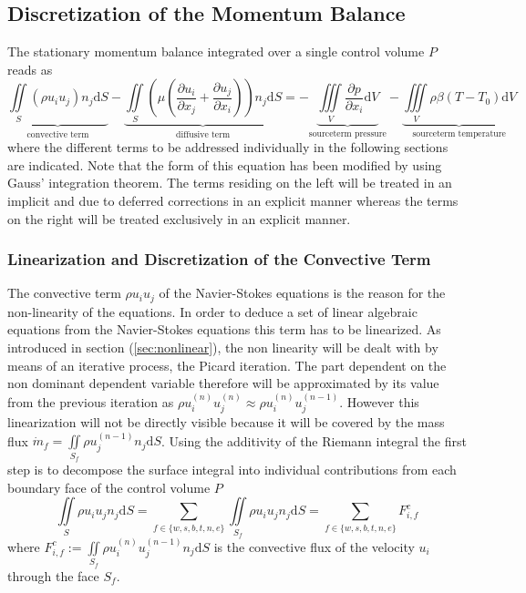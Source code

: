   \subsection{Discretization of the Momentum Balance}
  \label{sec:segdiscretization}

      The stationary momentum balance integrated over a single control volume \(P\) reads as
      \begin{equation}
        \label{eq:semidiscrete}
        \underbrace{\iint\limits_S (\rho u_i u_j)n_j \mathrm{d}S}_{\text{convective term}}
        - \underbrace{\iint\limits_S \left(\mu \left( \frac{\partial u_i}{\partial x_j} + \frac{\partial u_j}{\partial x_i}\right)\right)n_j \mathrm{d}S}_{\text{diffusive term}}
        = - \underbrace{\iiint\limits_V \frac{\partial p}{\partial x_i} \mathrm{d}V}_{\text{sourceterm pressure}}
        - \underbrace{\iiint\limits_V \rho \beta \left(T - T_0\right) \mathrm{d}V}_{\text{sourceterm temperature}}
      \end{equation}
      where the different terms to be addressed individually in the following sections are indicated. Note that the form of this equation has been modified by using Gauss' integration theorem. The terms residing on the left will be treated in an implicit and due to deferred corrections in an explicit manner whereas the terms on the right will be treated exclusively in an  explicit manner.

      \subsubsection{Linearization and Discretization of the Convective Term}

      The convective term \(\rho u_i u_j\) of the Navier-Stokes equations is the reason for the non-linearity of the equations. In order to deduce a set of linear algebraic equations from the Navier-Stokes equations this term has to be linearized. As introduced in section (\ref{sec:nonlinear}), the non linearity will be dealt with by means of an iterative process, the Picard iteration. The part dependent on the non dominant dependent variable therefore will be approximated by its value from the previous iteration as \( \rho u_i^{(n)} u_j^{(n)} \approx \rho u_i^{(n)} u_j^{(n-1)} \). However this linearization will not be directly visible because it will be covered by the mass flux \(\dot{m}_f = \iint\limits_{S_f} \rho u_j^{(n-1)} n_j \mathrm{d}S \). Using the additivity of the Riemann integral the first step is to decompose the surface integral into individual contributions from each boundary face of the control volume \(P\)
      \begin{displaymath}
      \iint\limits_S \rho u_i u_jn_j \mathrm{d}S
      = \sum_{f \in \{w,s,b,t,n,e\}} \iint\limits_{S_f}\rho u_{i} u_{j} n_{j} \mathrm{d}S
      = \sum_{f \in \{w,s,b,t,n,e\}} F_{i,f}^{c}
      \end{displaymath}
      where \(F_{i,f}^c := \iint\limits_{S_f} \rho u_{i}^{(n)} u_{j}^{(n-1)} n_{j} \mathrm{d}S \) is the convective flux of the velocity \(u_i\) through the face \(S_f\). 
      
